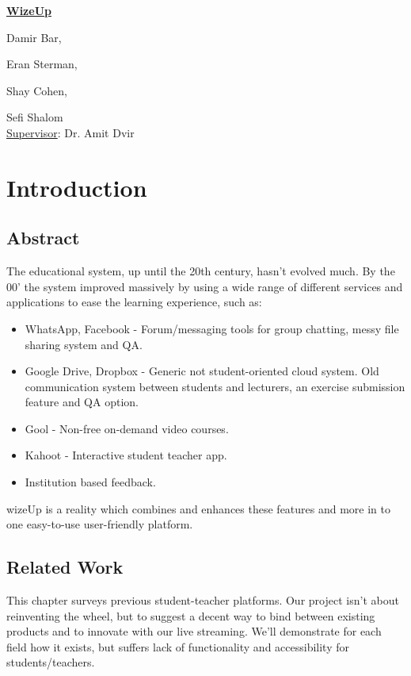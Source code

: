 \documentclass[12pt,a4paper]{article}
\begin{document}
    \textbf{\underline{WizeUp}}

    Damir Bar,

    Eran Sterman,

    Shay Cohen,

    Sefi Shalom \\

    {\underline{Supervisor}}: Dr. Amit Dvir
    \newpage

    \tableofcontents

    \newpage

    \section{Introduction}

    \subsection{Abstract}

    The educational system, up until the 20th century, hasn't evolved much. By the 00' the system improved massively by using a wide range of different services and applications to ease the learning experience, such as:

    \begin{itemize}
        \item WhatsApp, Facebook - Forum/messaging tools for group chatting,
        messy file sharing system and QA.
        \item Google Drive, Dropbox - Generic not student-oriented cloud system.
        Old communication system between students and lecturers, an exercise
        submission feature and QA option.
        \item Gool - Non-free on-demand video courses.
        \item Kahoot - Interactive student teacher app.
        \item Institution based feedback.
    \end{itemize}
    wizeUp is a reality which combines
    and enhances these features and more in to one easy-to-use user-friendly
    platform.



    \subsection{Related Work}


    This chapter surveys previous student-teacher platforms. Our project
    isn't about reinventing the wheel, but to suggest a decent way to bind
    between existing products and to innovate with our live streaming.
    We'll demonstrate for each field how it exists, but suffers lack of
    functionality and accessibility for students/teachers.
\end{document}

